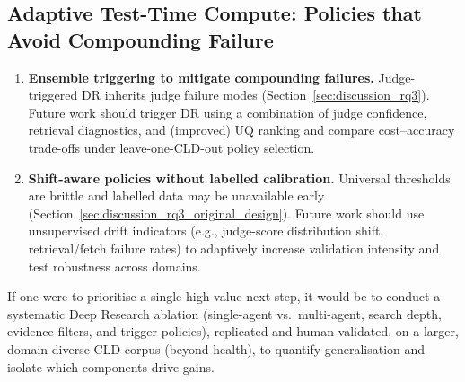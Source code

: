 \subsection{Adaptive Test-Time Compute: Policies that Avoid Compounding Failure}
\begin{enumerate}[noitemsep]
    \item \textbf{Ensemble triggering to mitigate compounding failures.} Judge-triggered DR inherits judge failure modes (Section~\ref{sec:discussion_rq3}). Future work should trigger DR using a combination of judge confidence, retrieval diagnostics, and (improved) UQ ranking and compare cost--accuracy trade-offs under leave-one-CLD-out policy selection.
    \item \textbf{Shift-aware policies without labelled calibration.} Universal thresholds are brittle and labelled data may be unavailable early (Section~\ref{sec:discussion_rq3_original_design}). Future work should use unsupervised drift indicators (e.g., judge-score distribution shift, retrieval/fetch failure rates) to adaptively increase validation intensity and test robustness across domains.
\end{enumerate}

If one were to prioritise a single high-value next step, it would be to conduct a systematic Deep Research ablation (single-agent vs.\ multi-agent, search depth, evidence filters, and trigger policies), replicated and human-validated, on a larger, domain-diverse CLD corpus (beyond health), to quantify generalisation and isolate which components drive gains.
